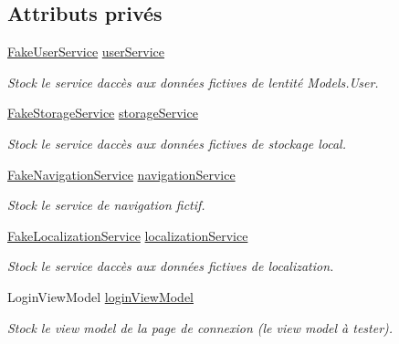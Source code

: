\subsection*{Attributs privés}
\begin{DoxyCompactItemize}
\item 
\hyperlink{class_boxes_1_1_tests_1_1_mock_1_1_services_1_1_fake_user_service}{Fake\+User\+Service} \hyperlink{class_boxes_1_1_tests_1_1_login_view_model_tests_af00de8c20362d15b8fdccb9656f0f401}{user\+Service}
\begin{DoxyCompactList}\small\item\em Stock le service d\textquotesingle{}accès aux données fictives de l\textquotesingle{}entité Models.\+User. \end{DoxyCompactList}\item 
\hyperlink{class_boxes_1_1_tests_1_1_mock_1_1_services_1_1_fake_storage_service}{Fake\+Storage\+Service} \hyperlink{class_boxes_1_1_tests_1_1_login_view_model_tests_a5c0b50fa214b17807b8e8f29dde9e245}{storage\+Service}
\begin{DoxyCompactList}\small\item\em Stock le service d\textquotesingle{}accès aux données fictives de stockage local. \end{DoxyCompactList}\item 
\hyperlink{class_boxes_1_1_tests_1_1_mock_1_1_services_1_1_fake_navigation_service}{Fake\+Navigation\+Service} \hyperlink{class_boxes_1_1_tests_1_1_login_view_model_tests_af2c999098015819dbb7750db45bf1615}{navigation\+Service}
\begin{DoxyCompactList}\small\item\em Stock le service de navigation fictif. \end{DoxyCompactList}\item 
\hyperlink{class_boxes_1_1_tests_1_1_mock_1_1_services_1_1_fake_localization_service}{Fake\+Localization\+Service} \hyperlink{class_boxes_1_1_tests_1_1_login_view_model_tests_a36e0274da1520d2f92caecb3149a87ee}{localization\+Service}
\begin{DoxyCompactList}\small\item\em Stock le service d\textquotesingle{}accès aux données fictives de localization. \end{DoxyCompactList}\item 
Login\+View\+Model \hyperlink{class_boxes_1_1_tests_1_1_login_view_model_tests_acb0fb5168c69823474cdbf1f4a70d740}{login\+View\+Model}
\begin{DoxyCompactList}\small\item\em Stock le view model de la page de connexion (le view model à tester). \end{DoxyCompactList}\end{DoxyCompactItemize}
